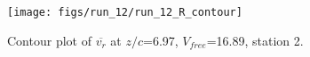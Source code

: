 \begin{figure}[H]
\centering
\texttt{[image: figs/run\_12/run\_12\_R\_contour]}
\caption{Contour plot of $\overline{v_{r}}$ at $z/c$=6.97, $V_{free}$=16.89, station 2.}
\label{fig:run_12_R_contour}
\end{figure}


